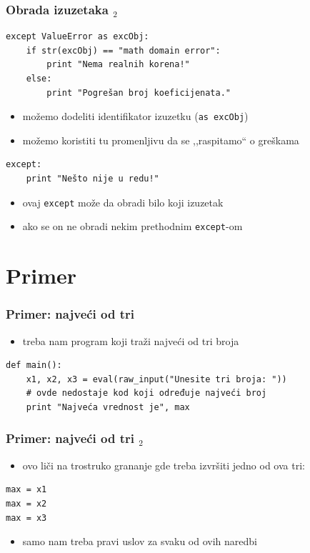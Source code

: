 \documentclass[utf8,compress]{beamer}
\begin{document}
\begin{frame}[fragile]
  \frametitle{Obrada izuzetaka $_2$}
\begin{verbatim}
except ValueError as excObj:
    if str(excObj) == "math domain error":
        print "Nema realnih korena!"
    else:
        print "Pogrešan broj koeficijenata."
\end{verbatim}
  \begin{itemize}
    \item možemo dodeliti identifikator izuzetku (\texttt{as excObj})
    \item možemo koristiti tu promenljivu da se ,,raspitamo`` o greškama
  \end{itemize}
\begin{verbatim}
except:
    print "Nešto nije u redu!"
\end{verbatim}
  \begin{itemize}
    \item ovaj \texttt{except} može da obradi bilo koji izuzetak
    \item ako se on ne obradi nekim prethodnim \texttt{except}-om
  \end{itemize}
\end{frame}

\section{Primer}

\begin{frame}[fragile]
  \frametitle{Primer: najveći od tri}
  \begin{itemize}
    \item treba nam program koji traži najveći od tri broja
  \end{itemize}
\begin{verbatim}
def main():
    x1, x2, x3 = eval(raw_input("Unesite tri broja: "))
    # ovde nedostaje kod koji određuje najveći broj
    print "Najveća vrednost je", max
\end{verbatim}
\end{frame}

\begin{frame}[fragile]
  \frametitle{Primer: najveći od tri $_2$}
  \begin{itemize}
    \item ovo liči na trostruko grananje gde treba izvršiti jedno od ova tri:
  \end{itemize}
\begin{verbatim}
max = x1
max = x2
max = x3
\end{verbatim}
  \begin{itemize}
    \item samo nam treba pravi uslov za svaku od ovih naredbi
  \end{itemize}
\end{frame}
\end{document}
